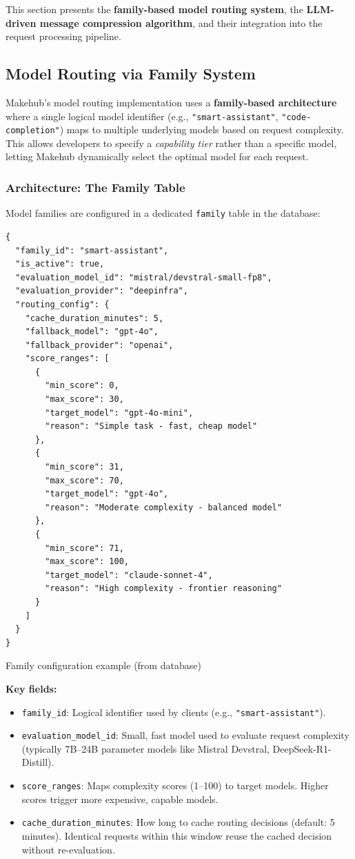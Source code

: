 \documentclass[english]{article}
\begin{document}
This section presents the \textbf{family-based model routing system}, the \textbf{LLM-driven message compression algorithm}, and their integration into the request processing pipeline.

\subsection{Model Routing via Family System}

Makehub's model routing implementation uses a \textbf{family-based architecture} where a single logical model identifier (e.g., \texttt{"smart-assistant"}, \texttt{"code-completion"}) maps to multiple underlying models based on request complexity. This allows developers to specify a \emph{capability tier} rather than a specific model, letting Makehub dynamically select the optimal model for each request.

\subsubsection{Architecture: The Family Table}

Model families are configured in a dedicated \texttt{family} table in the database:

\begin{listing}[H]
\begin{verbatim}
{
  "family_id": "smart-assistant",
  "is_active": true,
  "evaluation_model_id": "mistral/devstral-small-fp8",
  "evaluation_provider": "deepinfra",
  "routing_config": {
    "cache_duration_minutes": 5,
    "fallback_model": "gpt-4o",
    "fallback_provider": "openai",
    "score_ranges": [
      {
        "min_score": 0,
        "max_score": 30,
        "target_model": "gpt-4o-mini",
        "reason": "Simple task - fast, cheap model"
      },
      {
        "min_score": 31,
        "max_score": 70,
        "target_model": "gpt-4o",
        "reason": "Moderate complexity - balanced model"
      },
      {
        "min_score": 71,
        "max_score": 100,
        "target_model": "claude-sonnet-4",
        "reason": "High complexity - frontier reasoning"
      }
    ]
  }
}
\end{verbatim}
\caption{Family configuration example (from database)}
\end{listing}

\textbf{Key fields:}
\begin{itemize}
    \item \texttt{family\_id}: Logical identifier used by clients (e.g., \texttt{"smart-assistant"}).
    \item \texttt{evaluation\_model\_id}: Small, fast model used to evaluate request complexity (typically 7B--24B parameter models like Mistral Devstral, DeepSeek-R1-Distill).
    \item \texttt{score\_ranges}: Maps complexity scores (1--100) to target models. Higher scores trigger more expensive, capable models.
    \item \texttt{cache\_duration\_minutes}: How long to cache routing decisions (default: 5 minutes). Identical requests within this window reuse the cached decision without re-evaluation.
\end{itemize}
\end{document}
